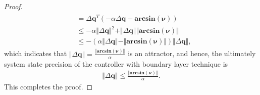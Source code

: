 \documentclass[3p]{elsarticle}
\theoremstyle{plain}
\theoremstyle{remark}
\begin{document}
\begin{proof}
\begin{align}
\begin{split}
&=\Delta\bm q^T(-\alpha\Delta\bm q+\boldsymbol{arcsin}(\bm \nu))\\
&\le-\alpha\Vert\Delta\bm q\Vert^2+\Vert\Delta\bm q\Vert\Vert\boldsymbol{arcsin}(\bm \nu)\Vert\\
&\le-(\alpha\Vert\Delta\bm q\Vert-\Vert\boldsymbol{arcsin}(\bm \nu)\Vert)\Vert\Delta\bm q\Vert,
\end{split}\end{align}
which indicates that $\Vert\Delta\bm q\Vert=\frac{\Vert\boldsymbol{arcsin}(\bm \nu)\Vert}{\alpha}$ is an attractor, and hence, the ultimately system state precision of the controller with boundary layer technique is
\begin{align}
  \Vert\Delta\bm q\Vert\le\frac{\Vert\boldsymbol{arcsin}(\bm \nu)\Vert}{\alpha}.
\end{align}
This completes the proof.
\end{proof}
\end{document}
